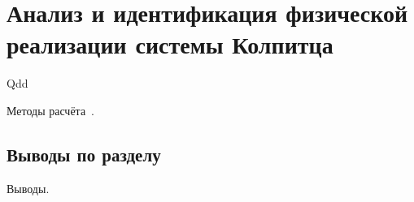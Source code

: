 \chapter{Анализ и идентификация физической реализации системы Колпитца}

Qdd

Методы расчёта~\cite{zaeplnii_radio_calc}.

\section{Выводы по разделу \thechapter}

Выводы.

